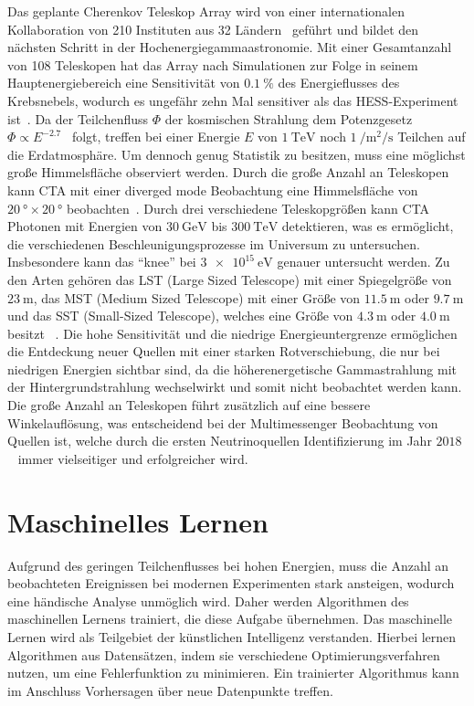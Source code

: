 Das geplante Cherenkov Teleskop Array wird von einer internationalen Kollaboration von 210 Instituten aus 32 Ländern~\cite{CTA_consortium} geführt
und bildet den nächsten Schritt in der Hochenergiegammaastronomie.
Mit einer Gesamtanzahl von 108 Teleskopen hat das Array nach Simulationen zur Folge in seinem Hauptenergiebereich eine Sensitivität von $\SI{0.1}{\percent}$
des Energieflusses des Krebsnebels, wodurch es ungefähr zehn Mal sensitiver als das HESS-Experiment ist~\cite{CTA_paper}.
Da der Teilchenfluss $\Phi$ der kosmischen Strahlung dem Potenzgesetz $\Phi \propto E^{-2.7}$~\cite[5]{Cosmic_rays} folgt,
treffen bei einer Energie $E$ von $\SI{1}{\tera\eV}$ noch $\SI{1}{\per\m\squared\per\s}$ Teilchen auf die Erdatmosphäre.
Um dennoch genug Statistik zu besitzen, muss eine möglichst große Himmelsfläche observiert werden.
Durch die große Anzahl an Teleskopen kann CTA mit einer diverged mode Beobachtung eine Himmelsfläche von $\SI{20}{\degree}\times \SI{20}{\degree}$
beobachten~\cite[16]{CTAscience}.
Durch drei verschiedene Teleskopgrößen kann CTA Photonen mit Energien von $\SI{30}{\giga\eV}$ bis $\SI{300}{\tera\eV}$ detektieren,
was es ermöglicht, die verschiedenen Beschleunigungsprozesse im Universum zu untersuchen.
Insbesondere kann das \enquote{knee} bei $\SI{3e15}{\eV}$ genauer untersucht werden.
Zu den Arten gehören das LST (Large Sized Telescope) mit einer Spiegelgröße von $\SI{23}{\m}$, das MST (Medium Sized Telescope)
mit einer Größe von $\SI{11.5}{\m}$ oder $\SI{9.7}{\m}$ und das SST (Small-Sized Telescope), welches eine Größe von $\SI{4.3}{\m}$ oder $\SI{4.0}{\m}$
besitzt~\cite{CTA_tec} .
Die hohe Sensitivität und die niedrige Energieuntergrenze ermöglichen die Entdeckung neuer Quellen mit einer starken Rotverschiebung, die nur bei niedrigen
Energien sichtbar sind, da die höherenergetische Gammastrahlung mit der Hintergrundstrahlung wechselwirkt und somit nicht beobachtet werden kann.
Die große Anzahl an Teleskopen führt zusätzlich auf eine bessere Winkelauflösung, was entscheidend bei der Multimessenger Beobachtung von Quellen ist, welche
durch die ersten Neutrinoquellen Identifizierung im Jahr $2018$ ~\cite{IceCubeobs} immer vielseitiger und erfolgreicher wird.

\section{Maschinelles Lernen}
\label{sec:ML}

Aufgrund des geringen Teilchenflusses bei hohen Energien, muss die Anzahl an beobachteten Ereignissen bei modernen
Experimenten stark ansteigen, wodurch eine händische Analyse unmöglich wird.
Daher werden Algorithmen des maschinellen Lernens trainiert, die diese Aufgabe übernehmen.
Das maschinelle Lernen wird als Teilgebiet der künstlichen Intelligenz verstanden. Hierbei lernen Algorithmen aus Datensätzen,
indem sie verschiedene Optimierungsverfahren nutzen, um eine Fehlerfunktion zu minimieren.
Ein trainierter Algorithmus kann im Anschluss Vorhersagen über neue Datenpunkte treffen.

